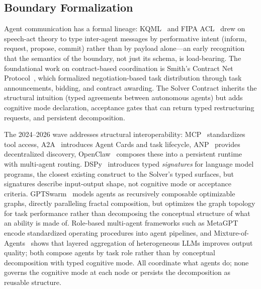 \documentclass[11pt]{article}
\begin{document}
\subsection{Boundary Formalization}
\label{sec:boundary-formalization}

Agent communication has a formal lineage: KQML~\cite{finin1994kqml} and FIPA ACL~\cite{FIPA2002} drew on speech-act theory to type inter-agent messages by performative intent (inform, request, propose, commit) rather than by payload alone---an early recognition that the semantics of the boundary, not just its schema, is load-bearing. The foundational work on contract-based coordination is Smith's Contract Net Protocol~\cite{Smith1980}, which formalized negotiation-based task distribution through task announcements, bidding, and contract awarding. The Solver Contract inherits the structural intuition (typed agreements between autonomous agents) but adds cognitive mode declaration, acceptance gates that can return typed restructuring requests, and persistent decomposition.

The 2024--2026 wave addresses structural interoperability: MCP~\cite{anthropic2024mcp} standardizes tool access, A2A~\cite{google2025a2a} introduces Agent Cards and task lifecycle, ANP~\cite{ANP2025} provides decentralized discovery, OpenClaw~\cite{steinberger2025openclaw} composes these into a persistent runtime with multi-agent routing. DSPy~\cite{khattab2024dspy} introduces typed \emph{signatures} for language model programs, the closest existing construct to the Solver's typed surfaces, but signatures describe input-output shape, not cognitive mode or acceptance criteria. GPTSwarm~\cite{zhuge2024gptswarm} models agents as recursively composable optimizable graphs, directly paralleling fractal composition, but optimizes the graph topology for task performance rather than decomposing the conceptual structure of what an ability is made of. Role-based multi-agent frameworks such as MetaGPT~\cite{hong2024metagpt} encode standardized operating procedures into agent pipelines, and Mixture-of-Agents~\cite{wang2024moa} shows that layered aggregation of heterogeneous LLMs improves output quality; both compose agents by task role rather than by conceptual decomposition with typed cognitive mode. All coordinate what agents do; none governs the cognitive mode at each node or persists the decomposition as reusable structure.
\end{document}
